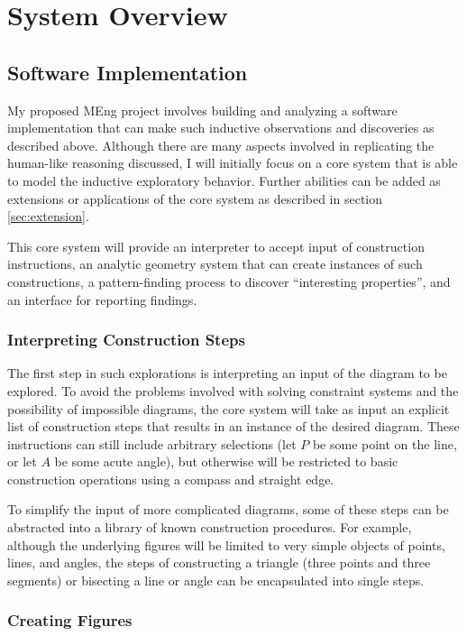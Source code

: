 \chapter{System Overview}
\label{chap:sys-overview}

\section{Software Implementation}

My proposed MEng project involves building and analyzing a software
implementation that can make such inductive observations and
discoveries as described above.  Although there are many aspects
involved in replicating the human-like reasoning discussed, I will
initially focus on a core system that is able to model the inductive
exploratory behavior.  Further abilities can be added as extensions or
applications of the core system as described in section
\ref{sec:extension}.

This core system will provide an interpreter to accept input of
construction instructions, an analytic geometry system that can create
instances of such constructions, a pattern-finding process to discover
``interesting properties'', and an interface for reporting findings.

\subsection{Interpreting Construction Steps}

The first step in such explorations is interpreting an input of the
diagram to be explored.  To avoid the problems involved with solving
constraint systems and the possibility of impossible diagrams, the
core system will take as input an explicit list of construction steps
that results in an instance of the desired diagram.  These
instructions can still include arbitrary selections (let $P$ be some
point on the line, or let $A$ be some acute angle), but otherwise will
be restricted to basic construction operations using a compass and
straight edge.

To simplify the input of more complicated diagrams, some of these
steps can be abstracted into a library of known construction
procedures.  For example, although the underlying figures will be
limited to very simple objects of points, lines, and angles, the steps
of constructing a triangle (three points and three segments) or
bisecting a line or angle can be encapsulated into single steps.

\subsection{Creating Figures}

